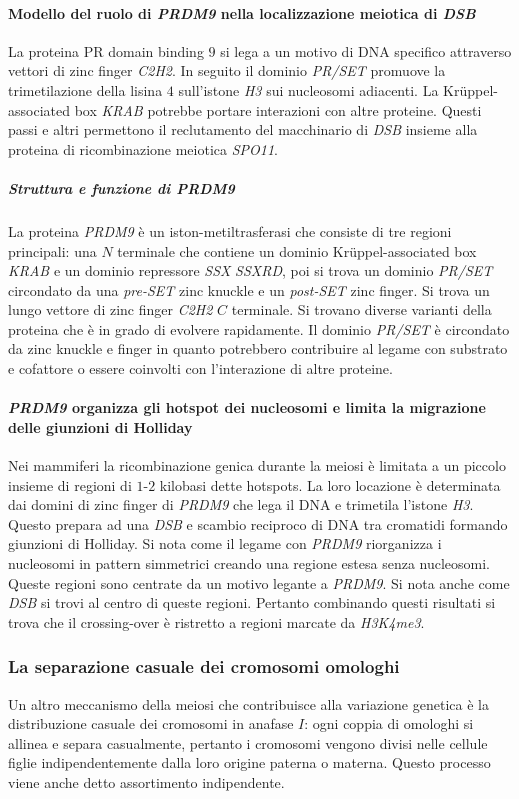 \paragraph{Modello del ruolo di \emph{PRDM9} nella localizzazione meiotica di \emph{DSB}}
La proteina PR domain binding $9$ si lega a un motivo di DNA specifico attraverso vettori di zinc finger \emph{C2H2}. In seguito il dominio \emph{PR/SET} promuove la trimetilazione 
della lisina $4$ sull'istone \emph{H3} sui nucleosomi adiacenti. La Kr\"uppel-associated box \emph{KRAB} potrebbe portare interazioni con altre proteine. Questi passi e altri permettono
il reclutamento del macchinario di \emph{DSB} insieme alla proteina di ricombinazione meiotica \emph{SPO11}.
\subparagraph{Struttura e funzione di \emph{PRDM9}}
La proteina \emph{PRDM9} \`e un iston-metiltrasferasi che consiste di tre regioni principali: una $N$ terminale che contiene un dominio Kr\"uppel-associated box \emph{KRAB} e un dominio
repressore \emph{SSX} \emph{SSXRD}, poi si trova un dominio \emph{PR/SET} circondato da una \emph{pre-SET} zinc knuckle e un \emph{post-SET} zinc finger. Si trova un lungo vettore di 
zinc finger \emph{C2H2} $C$ terminale. Si trovano diverse varianti della proteina che \`e in grado di evolvere rapidamente. Il dominio \emph{PR/SET} \`e circondato da zinc knuckle e 
finger in quanto potrebbero contribuire al legame con substrato e cofattore o essere coinvolti con l'interazione di altre proteine. 
\paragraph{\emph{PRDM9} organizza gli hotspot dei nucleosomi e limita la migrazione delle giunzioni di Holliday}
Nei mammiferi la ricombinazione genica durante la meiosi \`e limitata a un piccolo insieme di regioni di $1$-$2$ kilobasi dette hotspots. La loro locazione \`e determinata dai domini 
di zinc finger di \emph{PRDM9} che lega il DNA e trimetila l'istone \emph{H3}. Questo prepara ad una \emph{DSB} e scambio reciproco di DNA tra cromatidi formando giunzioni di Holliday. 
Si nota come il legame con \emph{PRDM9} riorganizza i nucleosomi in pattern simmetrici creando una regione estesa senza nucleosomi. Queste regioni sono centrate da un motivo legante a
\emph{PRDM9}. Si nota anche come \emph{DSB} si trovi al centro di queste regioni. Pertanto combinando questi risultati si trova che il crossing-over \`e ristretto a regioni marcate 
da \emph{H3K4me3}.
\subsubsection{La separazione casuale dei cromosomi omologhi}
Un altro meccanismo della meiosi che contribuisce alla variazione genetica \`e la distribuzione casuale dei cromosomi in anafase $I$: ogni coppia di omologhi si allinea e separa casualmente, pertanto
i cromosomi vengono divisi nelle cellule figlie indipendentemente dalla loro origine paterna o materna. Questo processo viene anche detto assortimento indipendente. 
